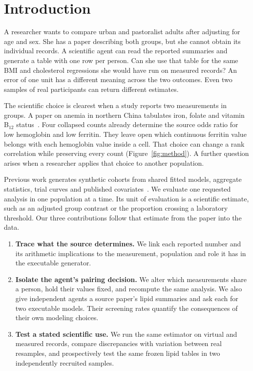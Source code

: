 \documentclass[sigconf,anonymous,review]{acmart}
\begin{document}
\section{Introduction}
A researcher wants to compare urban and pastoralist adults after adjusting for age and sex. She has a paper describing both groups, but she cannot obtain its individual records. A scientific agent can read the reported summaries and generate a table with one row per person. Can she use that table for the same BMI and cholesterol regressions she would have run on measured records? An error of one unit has a different meaning across the two outcomes. Even two samples of real participants can return different estimates.

The scientific choice is clearest when a study reports two measurements in groups. A paper on anemia in northern China tabulates iron, folate and vitamin B$_{12}$ status~\cite{zhu}. Four collapsed counts already determine the source odds ratio for low hemoglobin and low ferritin. They leave open which continuous ferritin value belongs with each hemoglobin value inside a cell. That choice can change a rank correlation while preserving every count (Figure~\ref{fig:method}). A further question arises when a researcher applies that choice to another population.

Previous work generates synthetic cohorts from shared fitted models, aggregate statistics, trial curves and published covariates~\cite{filshtein,llmsynthor,synthipd,kmgen}. We evaluate one requested analysis in one population at a time. Its unit of evaluation is a scientific estimate, such as an adjusted group contrast or the proportion crossing a laboratory threshold. Our three contributions follow that estimate from the paper into the data.
\begin{enumerate}
\item \textbf{Trace what the source determines.} We link each reported number and its arithmetic implications to the measurement, population and role it has in the executable generator.
\item \textbf{Isolate the agent's pairing decision.} We alter which measurements share a person, hold their values fixed, and recompute the same analysis. We also give independent agents a source paper's lipid summaries and ask each for two executable models. Their screening rates quantify the consequences of their own modeling choices.
\item \textbf{Test a stated scientific use.} We run the same estimator on virtual and measured records, compare discrepancies with variation between real resamples, and prospectively test the same frozen lipid tables in two independently recruited samples.
\end{enumerate}
\end{document}
